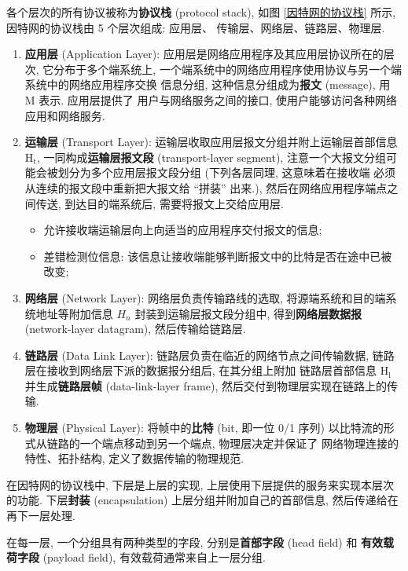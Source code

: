 \documentclass[10pt,UTF8]{book} %
\begin{document}
各个层次的所有协议被称为\textbf{协议栈} (protocol stack),
如图 \ref{因特网的协议栈} 所示, 因特网的协议栈由 5 个层次组成: 应用层、
传输层、网络层、链路层、物理层. 
\begin{enumerate}[label={$\left.\mathrm{\alph*}\right)$}, itemsep=0pt]
    \item \textbf{应用层} (Application Layer):
    应用层是网络应用程序及其应用层协议所在的层次, 它分布于多个端系统上,
    一个端系统中的网络应用程序使用协议与另一个端系统中的网络应用程序交换
    信息分组, 这种信息分组成为\textbf{报文} (message), 用 M 表示. 应用层提供了
    用户与网络服务之间的接口, 使用户能够访问各种网络应用和网络服务.
    \item \textbf{运输层} (Transport Layer):
    运输层收取应用层报文分组并附上运输层首部信息 $\mathrm{H}_\mathrm{t}$,
    一同构成\textbf{运输层报文段} (transport-layer segment), 
    注意一个大报文分组可能会被划分为多个应用层报文段分组 (下列各层同理, 这意味着在接收端
    必须从连续的报文段中重新把大报文给 “拼装” 出来.),
    然后在网络应用程序端点之间传送, 到达目的端系统后, 需要将报文上交给应用层.
    \begin{itemize}[itemsep=0pt]
        \item 允许接收端运输层向上向适当的应用程序交付报文的信息;
        \item 差错检测位信息: 该信息让接收端能够判断报文中的比特是否在途中已被改变;
    \end{itemize}
    \item \textbf{网络层} (Network Layer): 网络层负责传输路线的选取,
    将源端系统和目的端系统地址等附加信息 $H_n$ 封装到运输层报文段分组中, 得到\textbf{网络层数据报}
    (network-layer datagram), 然后传输给链路层.
    \item \textbf{链路层} (Data Link Layer): 链路层负责在临近的网络节点之间传输数据,
    链路层在接收到网络层下派的数据报分组后, 在其分组上附加
    链路层首部信息 $\mathrm{H_l}$ 并生成\textbf{链路层帧} (data-link-layer frame),
    然后交付到物理层实现在链路上的传输.
    \item \textbf{物理层} (Physical Layer): 将帧中的\textbf{比特} (bit,
    即一位 0/1 序列) 以比特流的形式从链路的一个端点移动到另一个端点, 物理层决定并保证了
    网络物理连接的特性、拓扑结构, 定义了数据传输的物理规范.
\end{enumerate}
在因特网的协议栈中, 下层是上层的实现, 上层使用下层提供的服务来实现本层次的功能.
下层\textbf{封装} (encapsulation) 上层分组并附加自己的首部信息,
然后传递给在再下一层处理.

在每一层, 一个分组具有两种类型的字段, 分别是\textbf{首部字段} (head field) 和
\textbf{有效载荷字段} (payload field), 有效载荷通常来自上一层分组.
\end{document}
